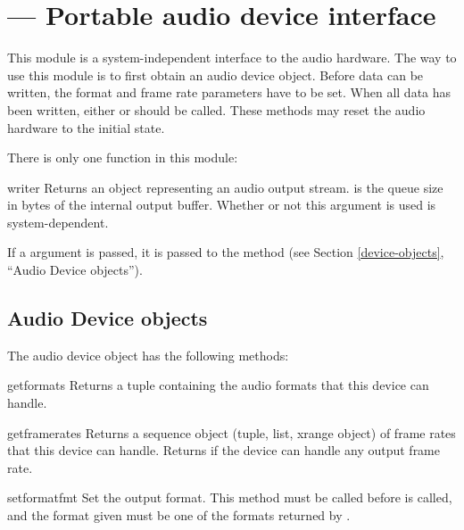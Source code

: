 \section{
         --- Portable audio device interface}


This module is a system-independent interface to the audio hardware.
The way to use this module is to first obtain an audio device object.
Before data can be written, the format and frame rate parameters have
to be set.  When all data has been written, either  or
 should be called.  These methods may reset the audio
hardware to the initial state.

There is only one function in this module:

\begin{funcdesc}{writer}{}
Returns an object representing an audio output stream.   is
the queue size in bytes of the internal output buffer.  Whether or not
this argument is used is system-dependent.

If a  argument is passed, it is passed to the 
method (see Section \ref{device-objects}, ``Audio Device objects'').
\end{funcdesc}


\subsection{Audio Device objects
	    \label{device-objects}}

The audio device object has the following methods:

\begin{methoddesc}{getformats}{}
Returns a tuple containing the audio formats that this device can
handle.
\end{methoddesc}

\begin{methoddesc}{getframerates}{}
Returns a sequence object (tuple, list, xrange object) of frame rates
that this device can handle.  Returns  if the device can
handle any output frame rate.
\end{methoddesc}

\begin{methoddesc}{setformat}{fmt}
Set the output format.  This method must be called before
 is called, and the format given must be one of the
formats returned by .
\end{methoddesc}

